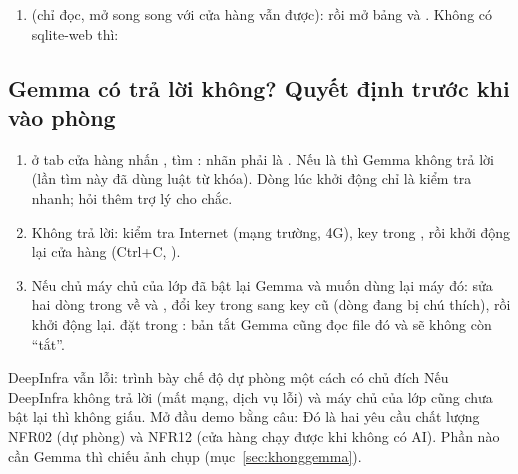 \begin{enumerate}[leftmargin=1.5em,itemsep=3pt]
\begin{center}
\begin{tabular}{@{}P{5.6cm}P{10.2cm}@{}}
,  & kết quả so sánh với VP; dòng cuối của lần chạy kiểm thử\\
\bottomrule
\end{tabular}
\end{center}
Cmd+P tìm theo tên file là đủ. Java nằm trong , lược đồ trong , hai file kết quả trong .
\item {} (chỉ đọc, mở song song với cửa hàng vẫn được):  rồi mở bảng  và . Không có sqlite-web thì:
\end{enumerate}

\subsection{Gemma có trả lời không? Quyết định trước khi vào phòng}\label{sec:gemma}
\begin{enumerate}[leftmargin=1.5em]
\item {} ở tab cửa hàng nhấn , tìm : nhãn phải là . Nếu là  thì Gemma không trả lời (lần tìm này đã dùng luật từ khóa). Dòng  lúc khởi động chỉ là kiểm tra nhanh; hỏi thêm trợ lý  cho chắc.
\item Không trả lời: kiểm tra Internet (mạng trường, 4G), key trong , rồi khởi động lại cửa hàng (Ctrl+C, ).
\item Nếu chủ máy chủ của lớp đã bật lại Gemma và muốn dùng lại máy đó: sửa hai dòng trong  về  và , đổi key trong  sang key cũ (dòng đang bị chú thích), rồi khởi động lại.  đặt  trong : bản tắt Gemma cũng đọc file đó và sẽ không còn ``tắt''.
\end{enumerate}
\begin{note}[warn]{DeepInfra vẫn lỗi: trình bày chế độ dự phòng một cách có chủ đích}
Nếu DeepInfra không trả lời (mất mạng, dịch vụ lỗi) và máy chủ của lớp cũng chưa bật lại thì không giấu. Mở đầu demo bằng câu:  Đó là hai yêu cầu chất lượng NFR02 (dự phòng) và NFR12 (cửa hàng chạy được khi không có AI). Phần nào cần Gemma thì chiếu ảnh chụp (mục~\ref{sec:khonggemma}).
\end{note}


